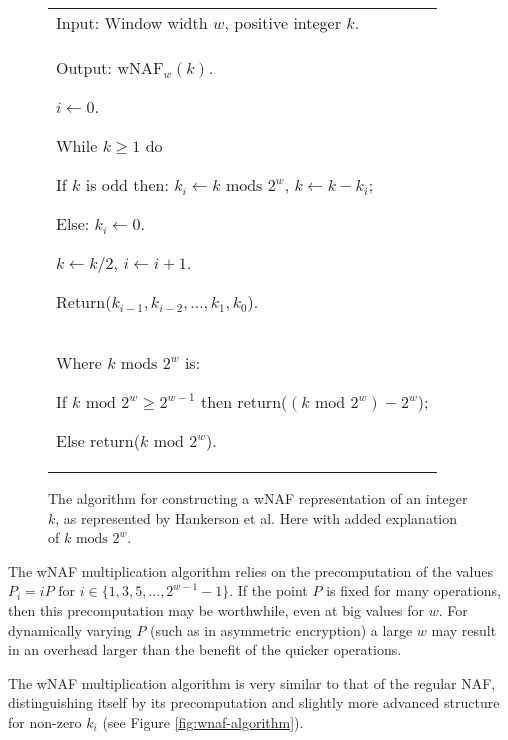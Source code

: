 \begin{figure}[htb!]
	\begin{tabular}{|p{\textwidth}|}
		\hline
		Input: Window width \(w\), positive integer \(k\). \\
		Output: \(\text{wNAF}_w(k)\).
		\begin{enumerate*}
			\item \(i \gets 0\).
			\item While \(k \geq 1\) do
			\begin{enumerate*}
				\item If \(k\) is odd then: \(k_i \gets k \text{ mods } 2^w\), \(k \gets k - k_i\);
				\item Else: \(k_i \gets 0\).
				\item \(k \gets k/2\), \(i \gets i + 1\).
			\end{enumerate*}
			\item Return(\(k_{i-1},k_{i-2},...,k_1,k_0\)).
		\end{enumerate*} \\
		\hline
		Where \(k \text{ mods } 2^w\) is: 
		\begin{enumerate*}
			\item If \(k \text{ mod } 2^w \geq 2^{w-1}\) then return(\((k \text{ mod } 2^w) - 2^w\));
			\item Else return(\(k \text{ mod } 2^w\)).
		\end{enumerate*} \\
		\hline
	\end{tabular}
	\caption{The algorithm for constructing a wNAF representation of an integer \(k\), as represented by Hankerson
		et al.\cite{hankerson2010} Here with added explanation of \(k \text{ mods } 2^w\).}
	\label{fig:compute-wnaf-algorithm}
\end{figure}

The wNAF multiplication algorithm relies on the precomputation of the values \(P_i = iP \text{ for } i \in \{1,3,5,...,2^{w-1}-1\}\). If the
point \(P\) is fixed for many operations, then this precomputation may be worthwhile, even at big values for \(w\). For dynamically varying
\(P\) (such as in asymmetric encryption) a large \(w\) may result in an overhead larger than the benefit of the quicker operations.

The wNAF multiplication algorithm is very similar to that of the regular NAF, distinguishing itself by its precomputation and slightly more
advanced structure for non-zero \(k_i\) (see Figure \ref{fig:wnaf-algorithm}).

